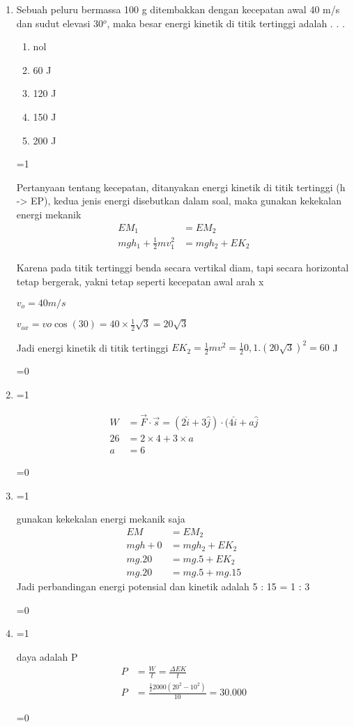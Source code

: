 \documentclass[10pt,a4paper]{article}
\def\tampilkunci{1}
\newcommand{\hide}[1]{\ifnum\tampilkunci=1
%
\begin{mybox}
 #1
\end{mybox}
%
\vspace{\baselineskip}\fi\ifnum\tampilkunci=0
%
%
\fi}
\newcommand{\pilgani}[1]{                            \vspace{-0.3cm}\begin{multicols}{2}
 \begin{enumerate}[label=\Alph*., itemsep=0pt,topsep=0pt,leftmargin=*,align=Center]#1                     \end{enumerate}
 \phantom{ini cuma sapi, wedus, dan ayam}
 \end{multicols}}
\begin{document}
\begin{multicols*}{2}
\begin{enumerate}
\item Sebuah peluru bermassa 100 g ditembakkan dengan kecepatan awal 40 m/s dan sudut elevasi 30$^o$, maka besar energi kinetik di titik tertinggi adalah . . .
\pilgani{
        \item nol
        \item 60 J
        \item 120 J
        \item 150 J
        \item 200 J
        }
 \hide{
 Pertanyaan tentang kecepatan, ditanyakan energi kinetik di titik tertinggi (h -> EP), kedua jenis energi disebutkan dalam soal, maka gunakan kekekalan energi mekanik
 \begin{align*}
EM_1 &=  EM_2\\
mgh_1 + \frac{1}{2}mv_1^2 &= mgh_2 + EK_2
 \end{align*}

Karena pada titik tertinggi benda secara vertikal diam, tapi secara horizontal tetap bergerak, yakni tetap seperti kecepatan awal arah x

$v_o = 40 m/s$

$v_{ox}= vo\cos (30) = 40\times \frac{1}{2}\sqrt{3}=20\sqrt{3}$

Jadi energi kinetik di titik tertinggi $EK_2=\frac{1}{2}mv^2=\frac{1}{2}0,1.(20\sqrt{3})^2=60$ J

}



\item 

\hide{
\begin{align*}
W &= \vec{F}\cdot\vec{s}=(2\hat{i}+3\hat{j})\cdot(4\hat{i} + a\hat{j}\\
26 &= 2\times 4 + 3\times a\\
a &= 6
\end{align*}
}

\item 

\hide{gunakan kekekalan energi mekanik saja
\begin{align*}
EM &= EM_2\\
mgh + 0 &= mgh_2 + EK_2\\
mg.20 &= mg.5 + EK_2\\
mg.20&= mg.5 + mg.15
\end{align*}
Jadi perbandingan energi potensial dan kinetik adalah 5 : 15 = 1 : 3
}

\item 

\hide{ daya adalah P
\begin{align*}
P &= \frac{W}{t}=\frac{\Delta EK}{t}\\
P &=\frac{ \frac{1}{2}2000(20^2-10^2)}{10}=30.000
\end{align*}
}


\end{enumerate}
\end{multicols*}
\end{document}
